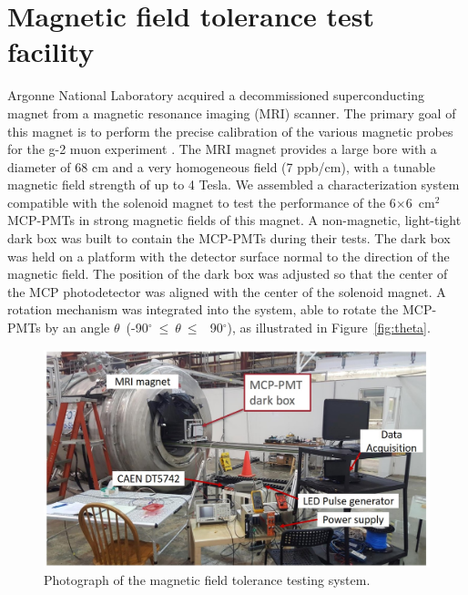 \documentclass[preprint,5p]{elsarticle}
\begin{document}
\section{Magnetic field tolerance test facility} \label{sc}
Argonne National Laboratory acquired a decommissioned superconducting magnet from
a magnetic resonance imaging (MRI) scanner.
 The primary goal of this magnet is to perform the precise calibration
of the various magnetic probes for the g-2 muon experiment \cite{18}. The MRI magnet provides a 
large bore with a diameter of 68 cm and a very homogeneous field (7 ppb/cm), 
with a tunable magnetic field strength of up to 4 Tesla.  We assembled a characterization 
system compatible with the solenoid magnet to test the performance of the 
6$\times$6~cm$^2$ MCP-PMTs in strong magnetic fields of this magnet. A 
non-magnetic, light-tight dark box was built to 
contain the MCP-PMTs during their tests. The dark box was held on a platform with the 
detector surface normal to the direction of the magnetic field. The position of 
the dark box was adjusted so that the center of the MCP photodetector was 
aligned with the center of the solenoid magnet. A rotation mechanism was 
integrated into the system, able to rotate the MCP-PMTs by an 
angle $\theta$~(-90$^{\circ}~\leq~\theta~\leq~$~90$^{\circ}$), as illustrated  in 
Figure~\ref{fig:theta}.

\begin{figure}[tbp]
\centering \includegraphics[scale=0.4]{fig/Figure4.jpg}
\caption{Photograph of the magnetic field tolerance testing system.} \label{fig:4}
\end{figure}
\end{document}
